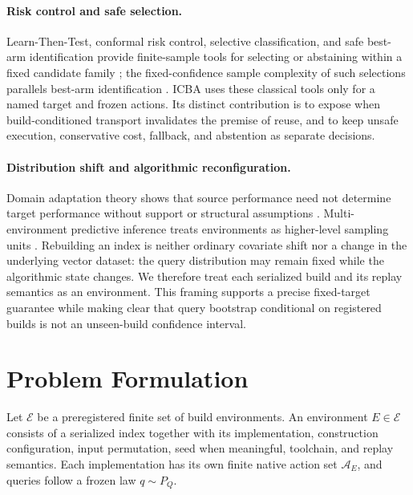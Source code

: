 \documentclass{article}
\newcommand{\Acal}{\mathcal{A}}
\newcommand{\Ecal}{\mathcal{E}}
\begin{document}
\paragraph{Risk control and safe selection.}
Learn-Then-Test, conformal risk control, selective classification, and safe best-arm identification provide
finite-sample tools for selecting or abstaining within a fixed candidate family
\citep{angelopoulos2025ltt,bates2021rcps,angelopoulos2024crc,elyaniv2010selective,wang2022safebai}; the
fixed-confidence sample complexity of such selections parallels best-arm identification
\citep{garivier2016bai}. ICBA uses these classical tools only for a named target and frozen actions. Its
distinct contribution is to expose when build-conditioned transport invalidates the premise of reuse, and
to keep unsafe execution, conservative cost, fallback, and abstention as separate decisions.

\paragraph{Distribution shift and algorithmic reconfiguration.}
Domain adaptation theory shows that source performance need not determine target performance without
support or structural assumptions \citep{bendavid2010theory,johansson2019support}. Multi-environment
predictive inference treats environments as higher-level sampling units \citep{duchi2025multienv}.
Rebuilding an index is neither ordinary covariate shift nor a change in the underlying vector dataset: the
query distribution may remain fixed while the algorithmic state changes. We therefore treat each serialized
build and its replay semantics as an environment. This framing supports a precise fixed-target guarantee
while making clear that query bootstrap conditional on registered builds is not an unseen-build confidence
interval.

\section{Problem Formulation}
\label{sec:formulation}

Let $\Ecal$ be a preregistered finite set of build environments. An environment $E\in\Ecal$ consists of a
serialized index together with its implementation, construction configuration, input permutation, seed when
meaningful, toolchain, and replay semantics. Each implementation has its own finite native action set
$\Acal_E$, and queries follow a frozen law $q\sim P_Q$.
\end{document}
